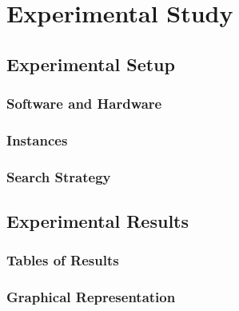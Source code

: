 \chapter{Experimental Study}
\section{Experimental Setup}
\subsection{Software and Hardware}
\subsection{Instances}
\subsection{Search Strategy}
\section{Experimental Results}
\subsection{Tables of Results}
\subsection{Graphical Representation}
